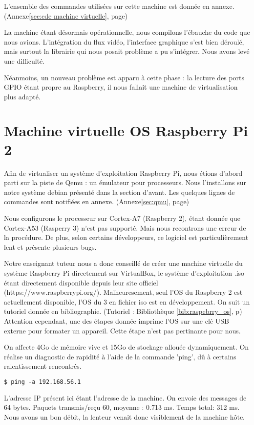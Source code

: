 \documentclass[a4paper]{report}
\begin{document}
    L'ensemble des commandes utilisées sur cette machine est donnée en annexe. (Annexe\ref{sec:cde machine virtuelle},
    page\pageref{sec:cde machine virtuelle})

    La machine étant désormais opérationnelle, nous compilons l'ébauche du code que nous avions.
    L'intégration du flux vidéo, l'interface graphique s'est bien déroulé, mais surtout
    la librairie qui nous posait problème a pu s'intégrer. Nous avons levé une difficulté.

    Néanmoins, un nouveau problème est apparu à cette phase : la lecture des ports GPIO étant
    propre au Raspberry, il nous fallait une machine de virtualisation plus adapté.
        
        \section{Machine virtuelle OS Raspberry Pi 2}
        
        Afin de virtualiser un système d'exploitation Raspberry Pi, nous étions d'abord parti sur
    la piste de Qemu : un émulateur pour processeurs. Nous l'installons sur notre système
    debian présenté dans la section d'avant.
    Les quelques lignes de commandes sont notifiées en annexe. (Annexe\ref{sec:qmu},
    page\pageref{sec:qmu})

    Nous configurons le processeur sur Cortex-A7 (Raspberry 2), étant donnée que Cortex-A53
    (Rasperry 3) n'est pas supporté. Mais nous recontrons une erreur de la procédure. De plus,
    selon certains développeurs, ce logiciel est particulièrement lent et présente plusieurs bugs.

    Notre enseignant tuteur nous a donc conseillé de créer une machine virtuelle du système
    Raspberry Pi directement sur VirtualBox, le système d'exploitation .iso étant directement
    disponible depuis leur site officiel (https://www.raspberrypi.org/). Malheuresement, seul 
    l'OS du Raspberry 2 est actuellement disponible, l'OS du 3 en fichier iso est en développement. 
    On suit un tutoriel donnée en bibliographie.  (Tutoriel : Bibliothèque \ref{bib:raspebrry_os},
    p\pageref{bib:raspebrry_os}) Attention cependant, une des étapes donnée imprime l'OS sur une 
    clé USB externe pour formater un appareil. Cette étape n'est pas pertinante pour nous.

    On affecte 4Go de mémoire vive et 15Go de stockage allouée dynamiquement. On réalise un
    diagnostic de rapidité à l'aide de la commande 'ping', dû à certains ralentissement rencontrés. 
    \begin{verbatim}$ ping -a 192.168.56.1 \end{verbatim}
    L'adresse IP présent ici étant l'adresse de la machine. On envoie des messages de 64 bytes. 
    Paquets transmis/reçu 60, moyenne : 0.713 ms. Temps total: 312 ms. Nous avons un bon débit,
    la lenteur venait donc visiblement de la machine h\^{o}te.
\end{document}
